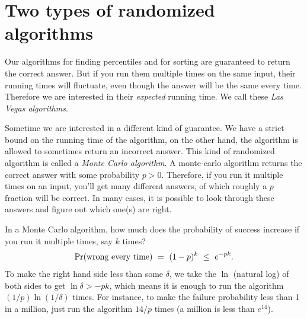 \documentclass{report}
\theoremstyle{plain}
\theoremstyle{definition}
\newcommand{\pr}{\mbox{\rm Pr}}
\begin{document}
\section{Two types of randomized algorithms}

Our algorithms for finding percentiles and for sorting are guaranteed to return 
the correct answer. But if you run them multiple times on the same input, their 
running times will fluctuate, even though the answer will be the same every time. 
Therefore we are interested in their {\it expected} running time. We call these 
{\it Las Vegas algorithms}.

Sometime we are interested in a different kind of guarantee. We have a
strict bound on the running time of the algorithm, on the other hand,
the algorithm is allowed to sometimes return an incorrect answer. This
kind of randomized algorithm is called a {\it Monte Carlo algorithm}.
A monte-carlo algorithm returns the correct answer with some
probability $p>0$.
Therefore, if you run it multiple times on an input, you'll
get many different answers, of which roughly a $p$ fraction will be
correct. In many cases, it is possible to look through these answers
and figure out which one(s) are right.

In a Monte Carlo algorithm, how much does the probability of success
increase if you run it multiple times, say $k$ times?
$$ \pr(\mbox{wrong every time}) \ = \ (1-p)^k \ \leq \ e^{-pk} .$$
To make the right hand side less than some $\delta$, we take the $\ln$ (natural log)
of both sides to get $\ln \delta > -p k$, which means it is enough
to run the algorithm $(1/p) \ln (1/\delta)$
times. For instance, to make the failure probability less than 1 in a
million, just run the algorithm $14/p$ times (a million is less than
$e^{14}$).
\end{document}
